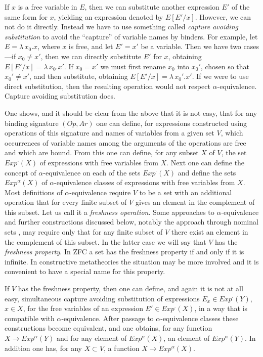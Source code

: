 \documentclass[onecolumn,12pt]{amsart}
\numberwithin{proposition}{subsection}
\newcommand{\sr}{\rightarrow}
\begin{document}
If $x$ is a free variable in $E$, then we can substitute another expression $E'$ of the
same form for $x$, yielding an expression denoted by $E[E'/x]$.  However, we can not do it directly. Instead we have to use
something called {\em capture avoiding substitution} to avoid the
``capture'' of variable names by binders. For example, let $E=\lambda\,x_0.x$,
where $x$ is free, and let $E'=x'$ be a variable.  Then we have two cases---if $x_0\ne x'$, then we
can directly substitute $E'$ for $x$, obtaining $E[E'/x]=\lambda\,x_0.x'$. If $x_0=x'$
we must first rename $x_0$ into $x_0'$, chosen so that $x_0'\ne x'$, and then
substitute, obtaining $E[E'/x]=\lambda\,x_0'.x'$. If we were to use direct
substitution, then the resulting operation would not respect 
$\alpha$-equivalence.  Capture avoiding substitution does.

One shows, and it should be clear from the above that it is not easy, that for
any binding signature $(Op,Ar)$ one can define, for expressions constructed
using operations of this signature and names of variables from a given set $V$,
which occurrences of variable names among the arguments of the operations are
free and which are bound. From this one can define, for any subset $X$ of $V$,
the set $Exp^{\cdot}(X)$ of expressions with free variables from $X$. Next one
can define the concept of $\alpha$-equivalence on each of the sets
$Exp^{\cdot}(X)$ and define the sets $Exp^{\alpha}(X)$ of $\alpha$-equivalence
classes of expressions with free variables from $X$. Most definitions of
$\alpha$-equivalence require $V$ to be a set with an additional operation that
for every finite subset of $V$ gives an element in the complement of this
subset. Let us call it a {\em freshness operation}. Some approaches to 
$\alpha$-equivalence and further constructions discussed below, notably the
approach through nominal sets \cite{Pitts}, may require only that for any
finite subset of $V$ there exist an element in the complement of this
subset. In the latter case we will say that $V$ has the \emph{freshness property}. In
ZFC a set has the freshness property if and only if it is infinite. In
constructive metatheories the situation may be more involved and it is
convenient to have a special name for this property.

If $V$ has the freshness property, then one can define, and again it is not at all
easy, simultaneous capture avoiding substitution of expressions 
$E_x\in Exp^{\cdot}(Y)$, $x\in X$, for the free variables of an expression 
$E' \in Exp^{\cdot}(X)$, in a way that is compatible with $\alpha$-equivalence.
After passage to $\alpha$-equivalence classes these constructions
become equivalent, and one obtains, for any function $X\sr Exp^{\alpha}(Y)$ and for
any element of $Exp^{\alpha}(X)$, an element of $Exp^{\alpha}(Y)$. In addition
one has, for any $X\subset V$, a function $X\sr Exp^{\alpha}(X)$.
\end{document}
